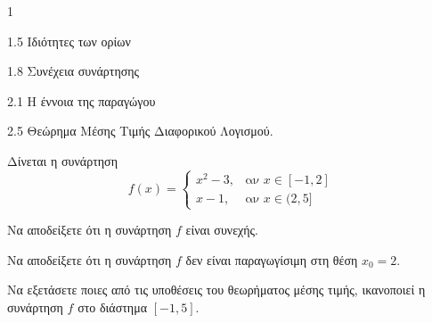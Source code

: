 \begin{ylh}{1}
    \item 1.5 Ιδιότητες των ορίων
    \item 1.8 Συνέχεια συνάρτησης
    \item 2.1 Η έννοια της παραγώγου
    \item 2.5 Θεώρημα Μέσης Τιμής Διαφορικού Λογισμού.
\end{ylh}
Δίνεται η συνάρτηση
\[
f(x)=\begin{cases}
x^2-3, & \text{αν } x \in [-1,2] \\
x-1, & \text{αν } x \in (2,5]
\end{cases}
\]
\begin{alist}
\item Να αποδείξετε ότι η συνάρτηση $f$ είναι συνεχής. 
\item Να αποδείξετε ότι η συνάρτηση $f$ δεν είναι παραγωγίσιμη στη θέση $x_0 = 2$. 
\item Να εξετάσετε ποιες από τις υποθέσεις του θεωρήματος μέσης τιμής, ικανοποιεί η συνάρτηση $f$ στο διάστημα $[-1,5]$. 
\end{alist}